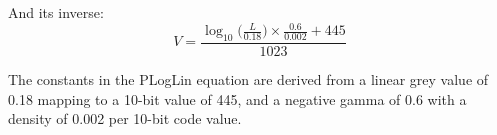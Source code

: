 \begin{figure}[H]
    \label{fig:plog}
\end{figure}

And its inverse:
\begin{equation}
    V = \frac{\log _{10}\big(\frac{L}{0.18}\big) \times \frac{0.6}{0.002} + 445}{1023}
\end{equation}

The constants in the PLogLin equation are derived from a linear grey value of 0.18 mapping to a 10-bit value of 445, and a negative gamma of 0.6 with a density of 0.002 per 10-bit code value.
